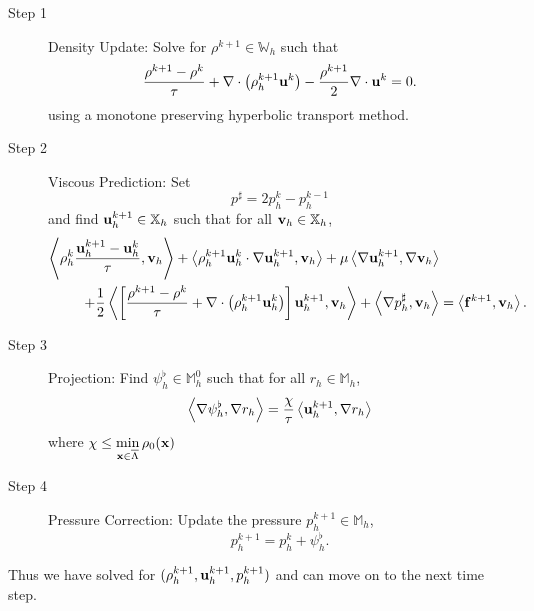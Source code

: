 \documentclass[letterpaper]{erdc}
\begin{document}
\begin{description}
  \item[Step 1] Density Update: Solve for $\rho^{k+1}\in \mathbb{W}_h$ such that
\begin{equation}
  \frac{\rho^{k+1} - \rho^k}{\tau} + \nabla\cdot\left(\rho_h^{k+1}\textbf{u}^{k} \right) - \frac{\rho^{k+1}}{2}\nabla\cdot\textbf{u}^{k} = 0.
\end{equation}
using a monotone preserving hyperbolic transport method.  

\item[Step 2] Viscous Prediction: Set 
\begin{equation}\label{eq:pressureextrapolation_uniformtimestep}
  p^{\sharp} = 2p_h^{k} - p_h^{k-1}
\end{equation}
and find $\textbf{u}^{k+1}_h\in\mathbb{X}_h$ such that for all $\textbf{v}_h\in\mathbb{X}_h$,
\begin{equation}
  \begin{split}
\left\langle  \rho_h^{k}\frac{\textbf{u}_h^{k+1}-\textbf{u}_h^{k} }{\tau} , \textbf{v}_h \right\rangle + \left\langle  \rho_h^{k+1}\textbf{u}_h^{k}\cdot\nabla\textbf{u}_h^{k+1} , \textbf{v}_h \right\rangle + \mu\left\langle  \nabla \textbf{u}_h^{k+1} , \nabla\textbf{v}_h \right\rangle& \\
+ \frac{1}{2}\left\langle \left[\frac{\rho^{k+1}-\rho^{k}}{\tau} + \nabla\cdot\left(\rho_h^{k+1}\textbf{u}_h^{k}\right)\right]\textbf{u}_h^{k+1} , \textbf{v}_h \right\rangle +\left\langle \nabla p_h^{\sharp}, \textbf{v}_h \right\rangle &= \left\langle \mathbf{f}^{k+1}, \textbf{v}_h \right\rangle.
\end{split}
\end{equation}

\item[Step 3] Projection: Find $\psi_h^{\flat}\in \mathbb{M}_h^0$ such that for all $r_h\in \mathbb{M}_h$,
\begin{equation}
  \left\langle \nabla\psi_h^{\flat}, \nabla r_h \right\rangle = \frac{\chi}{\tau}\left\langle \textbf{u}_h^{k+1}, \nabla r_h \right\rangle
\end{equation}
where $\chi \leq \displaystyle\min_{\textbf{x}\in\overline{\Lambda}}\rho_0(\textbf{x})$ 

\item[Step 4] Pressure Correction: Update the pressure $p_h^{k+1}\in \mathbb{M}_h$, 
\begin{equation}
p^{k+1}_h = p^{k}_h + \psi^{\flat}_h.
\end{equation}
\end{description}
Thus we have solved for $(\rho_h^{k+1}, \textbf{u}_h^{k+1}, p_h^{k+1})$ and can move
on to the next time step.
\end{document}
